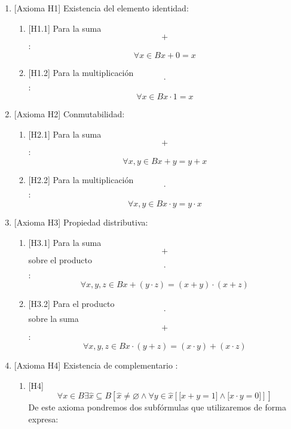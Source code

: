 \begin{enumerate}
\begin{enumerate}
    \begin{enumerate}
    \def\labelenumiii{\arabic{enumiii}.}
    \item
      {[}Axioma H1{]} Existencia del elemento identidad:

      \begin{enumerate}
      \def\labelenumiv{\arabic{enumiv}.}
      \tightlist
      \item
        {[}H1.1{]} Para la suma \[+\]: \[\forall{x \in B}{{x + 0} = x}\]
      \item
        {[}H1.2{]} Para la multiplicación \[\cdot\]:
        \[\forall{x \in B}{}{}{}{{x \cdot 1} = x}\]
      \end{enumerate}
    \item
      {[}Axioma H2{]} Conmutabilidad:

      \begin{enumerate}
      \def\labelenumiv{\arabic{enumiv}.}
      \tightlist
      \item
        {[}H2.1{]} Para la suma \[+\]:
        \[\forall x,{y \in B}{{x + y} = {y + x}}\]
      \item
        {[}H2.2{]} Para la multiplicación\[\cdot\]:
        \[\forall x,{y \in B}{{x \cdot y} = {y \cdot x}}\]
      \end{enumerate}
    \item
      {[}Axioma H3{]} Propiedad distributiva:

      \begin{enumerate}
      \def\labelenumiv{\arabic{enumiv}.}
      \tightlist
      \item
        {[}H3.1{]} Para la suma \[+\] sobre el
        producto\[\cdot\]:\[\forall x,y,{z \in B}{{x + {({y \cdot z})}} = {{({x + y})} \cdot {({x + z})}}}\]
      \item
        {[}H3.2{]} Para el producto\[\cdot\]sobre la suma
        \[+\]:\[\forall x,y,{z \in B}{{x \cdot {({y + z})}} = {{({x \cdot y})} + {({x \cdot z})}}}\]
      \end{enumerate}
    \item
      {[}Axioma H4{]} Existencia de complementario :

      \begin{enumerate}
      \def\labelenumiv{\arabic{enumiv}.}
      \item
        {[}H4{]}\[\forall{x \in B}{}{}{}\exists{\widehat{x} \subseteq B}{}{}{}{}\left\lbrack {{\widehat{x} \neq \varnothing} \land {\forall{y \in \widehat{x}}\left\lbrack {{\lbrack{{x + y} = 1}\rbrack} \land {\lbrack{{x \cdot y} = 0}\rbrack}} \right\rbrack}} \right\rbrack\]
        De este axioma pondremos dos subfórmulas que utilizaremos de
        forma expresa:


\end{enumerate}
\end{enumerate}
\end{enumerate}
\end{enumerate}
